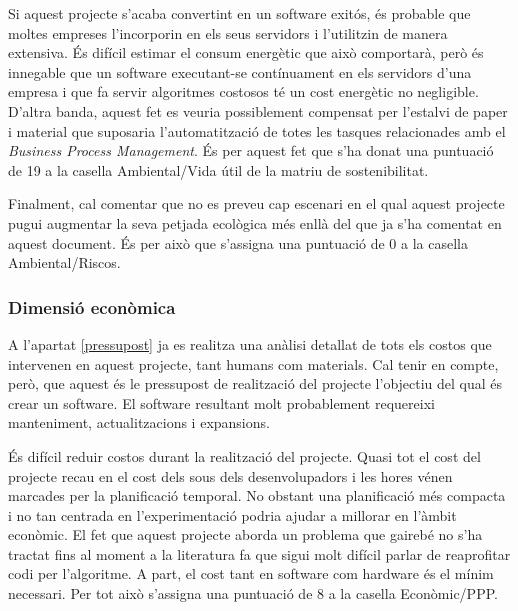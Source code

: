 \documentclass[10pt,a4paper]{article}
\begin{document}
Si aquest projecte s'acaba convertint en un software exitós, és probable que moltes empreses l'incorporin en els seus servidors i l'utilitzin de manera extensiva. És difícil estimar el consum energètic que això comportarà, però és innegable que un software executant-se contínuament en els servidors d'una empresa i que fa servir algoritmes costosos té un cost energètic no negligible. D'altra banda, aquest fet es veuria possiblement compensat per l'estalvi de paper i material que suposaria l'automatització de totes les tasques relacionades amb el \emph{Business Process Management}. És per aquest fet que s'ha donat una puntuació de 19 a la casella Ambiental/Vida útil de la matriu de sostenibilitat. 

Finalment, cal comentar que no es preveu cap escenari en el qual aquest projecte pugui augmentar la seva petjada ecològica més enllà del que ja s'ha comentat en aquest document. És per això que s'assigna una puntuació de 0 a la casella Ambiental/Riscos.


\subsubsection{Dimensió econòmica}
\label{economica}

A l'apartat \ref{pressupost} ja es realitza una anàlisi detallat de tots els costos que intervenen en aquest projecte, tant humans com materials. Cal tenir en compte, però, que aquest és le pressupost de realització del projecte l'objectiu del qual és crear un software. El software resultant molt probablement requereixi manteniment, actualitzacions i expansions. 

És difícil reduir costos durant la realització del projecte. Quasi tot el cost del projecte recau en el cost dels sous dels desenvolupadors i les hores vénen marcades per la planificació temporal. No obstant una planificació més compacta i no tan centrada en l'experimentació podria ajudar a millorar en l'àmbit econòmic. El fet que aquest projecte aborda un problema que gairebé no s'ha tractat fins al moment a la literatura fa que sigui molt difícil parlar de reaprofitar codi per l'algoritme. A part, el cost tant en software com hardware és el mínim necessari. Per tot això s'assigna una puntuació de 8 a la casella Econòmic/PPP.
\end{document}
